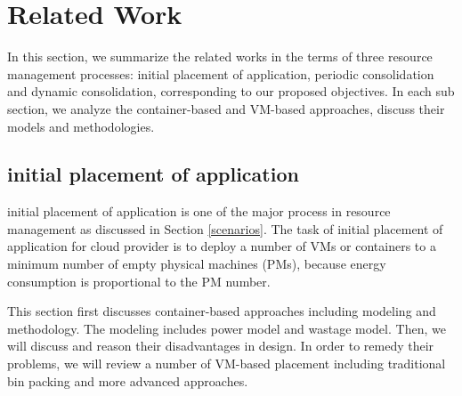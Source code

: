 
\section{Related Work}
\label{related_work}
In this section, we summarize the related works in the terms of three resource management processes: initial placement of application, periodic consolidation and dynamic consolidation, corresponding to our proposed objectives. In each sub section, we analyze the container-based and VM-based approaches, discuss their models and methodologies. 

\subsection{initial placement of application}
initial placement of application is one of the major process in resource management as discussed in Section \ref{scenarios}. 
The task of initial placement of application for cloud provider is to deploy a number of VMs or containers to a minimum number of empty physical machines (PMs), because energy consumption is proportional to the PM number.

This section first discusses container-based approaches including modeling and methodology. The modeling includes power model and wastage model. Then, we will discuss and reason their disadvantages in design. In order to remedy their problems, we will review a number of VM-based placement including traditional bin packing and more advanced approaches.




